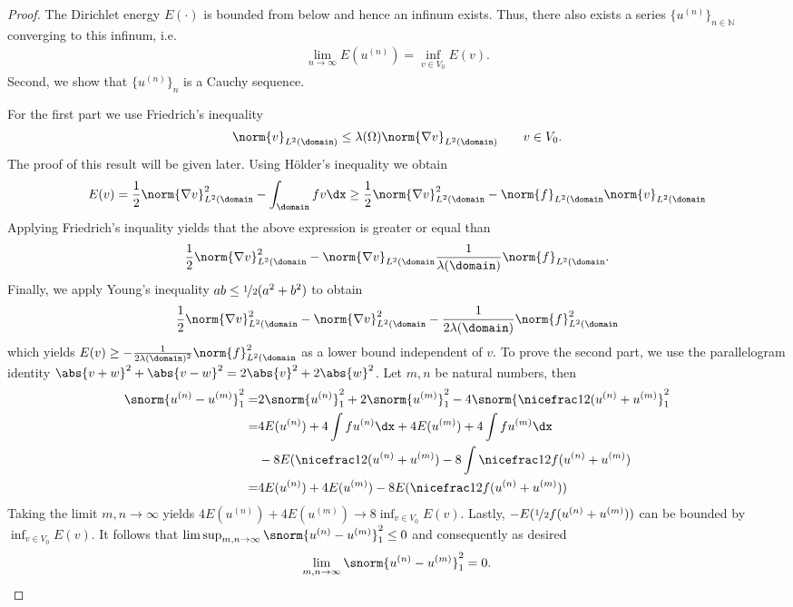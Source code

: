 \begin{proof}
  The Dirichlet energy $E(\cdot)$ is bounded from
  below and hence an infinum exists. Thus, there also exists a series
  $\{u^{(n)}\}_{n \in \mathbb{N}}$ converging to this infinum, i.e.
  \begin{gather*}
    \lim_{n \to \infty} E(u^{(n)}) = \inf_{v \in V_0} E(v).
  \end{gather*}
  Second, we show that $\{u^{(n)}\}_n$ is a Cauchy sequence.
  
  For the first part we use Friedrich's inequality
  \begin{gather*}
    \norm{v}_{L^2(\domain)} \le \lambda(\Omega)
    \norm{\nabla v}_{L^2(\domain)} \qquad v \in V_0.
  \end{gather*}
  The proof of this result will be given later. Using Hölder's inequality
  we obtain
  \begin{gather*}
    E(v) = \frac 12 \norm{\nabla v}^2 _{L^2(\domain} - \int_\domain fv \dx
    \ge \frac 12 \norm{\nabla v}^2 _{L^2(\domain}
    - \norm{f}_{L^2(\domain} \norm{v}_{L^2(\domain}
  \end{gather*}
  Applying Friedrich's inquality yields that the above expression is
  greater or equal than
  \begin{gather*}
    \frac 12 \norm{\nabla v}^2 _{L^2(\domain}
    - \norm{\nabla v}_{L^2(\domain} \frac 1{\lambda (\domain)}
    \norm{f}_{L^2(\domain}.
  \end{gather*}
  Finally, we apply Young's inequality $ab \le \nicefrac 12 (a^2 + b^2)$ to obtain
  \begin{gather*}
    \frac 12 \norm{\nabla v}^2 _{L^2(\domain}
    - \norm{\nabla v}_{L^2(\domain}^2 - \frac 1{2\lambda (\domain)} \norm{f}_{L^2(\domain}^2
  \end{gather*}
  which yields $E(v) \ge - \frac 1{2\lambda (\domain)^2} \norm{f}_{L^2(\domain}^2$
  as a lower bound independent of $v$. To prove the second part,
  we use the parallelogram identity $\abs{v+w}^2 + \abs{v-w}^2 = 2\abs{v}^2 + 2 \abs{w}^2$.
  Let $m, n$ be natural numbers, then
  \begin{align*}
    \snorm{u^{(n)} - u^{(m)}}^2 _1 =& 2 \snorm{u^{(n)}}^2 _1
                                      + 2 \snorm{u^{(m)}}^2_1- 4 \snorm{\nicefrac 12 (u^{(n)} + u^{(m)}}^2_1 \\
    =& 4 E(u^{(n)}) + 4\int f u^{(n)} \dx + 4 E(u^{(m)}) + 4\int f u^{(m)} \dx \\
                                    &- 8 E(\nicefrac 12 (u^{(n)} + u^{(m)}) - 8 \int \nicefrac 12 f(u^{(n)} + u^{(m)}) \\
    =& 4 E(u^{(n)}) + 4 E(u^{(m)}) - 8 E(\nicefrac 12 f(u^{(n)} + u^{(m)}))
  \end{align*}
  Taking the limit $m,n\to \infty$ yields $4 E(u^{(n)}) + 4 E(u^{(m)})
  \to 8 \inf_{v \in V_0} E(v)$. Lastly, $-E(\nicefrac 12 f(u^{(n)} + u^{(m)}))$ can
  be bounded by $\inf_{v \in V_0} E(v)$. It follows that $\limsup_{m,n\to\infty}
  \snorm{u^{(n)}-u^{(m)}}^2_1 \le 0$ and consequently as desired
  \begin{gather*}
    \lim_{m,n\to\infty} \snorm{u^{(n)}-u^{(m)}}^2_1 = 0.
  \end{gather*}    
\end{proof}

